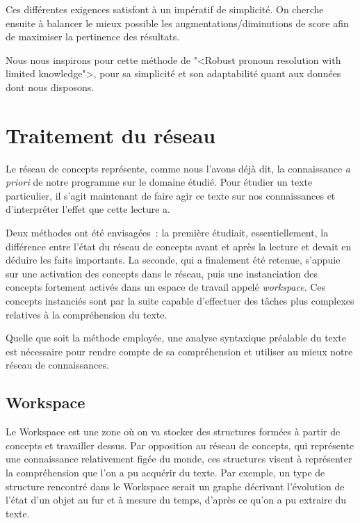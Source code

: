 \documentclass[a4paper, 12pt]{article}
\begin{document}
Ces différentes exigences satisfont à un impératif de simplicité. On cherche ensuite à balancer le mieux possible les augmentations/diminutions de score afin de maximiser la pertinence des résultats.

Nous nous inspirons pour cette méthode de "<Robust pronoun resolution with limited knowledge">, pour sa simplicité et son adaptabilité quant aux données dont nous disposons.





\section{Traitement du réseau}

Le réseau de concepts représente, comme nous l'avons déjà dit, la connaissance \textit{a priori} de notre programme sur le domaine étudié. Pour étudier un texte particulier, il s'agit maintenant de faire agir ce texte sur nos connaissances et d'interpréter l'effet que cette lecture a.

Deux méthodes ont été envisagées~: la première étudiait, essentiellement, la différence entre l'état du réseau de concepts avant et après la lecture et devait en déduire les faits importants. La seconde, qui a finalement été retenue, s'appuie sur une activation des concepts dans le réseau, puis une instanciation des concepts fortement activés dans un espace de travail appelé \textit{workspace}. Ces concepts instanciés sont par la suite capable d'effectuer des tâches plus complexes relatives à la compréhension du texte.

Quelle que soit la méthode employée, une analyse syntaxique préalable du texte est nécessaire pour rendre compte de sa compréhension et utiliser au mieux notre réseau de connaissances.

\subsection{Workspace}
Le Workspace est une zone où on va stocker des structures formées à partir de concepts et travailler dessus. Par opposition au réseau de concepts, qui représente une connaissance relativement figée du monde, ces structures visent à représenter la compréhension que l'on a pu acquérir du texte.
Par exemple, un type de structure rencontré dans le Workspace serait un graphe décrivant l'évolution de l'état d'un objet au fur et à mesure du temps, d'après ce qu'on a pu extraire du texte.
\end{document}
